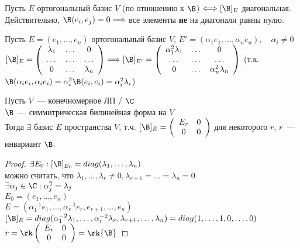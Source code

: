 \notice Пусть $E$ ортогональный базис $V$ (по отношению к $\B$) $\Longleftrightarrow [\B]_E$ диагональная. \\
Действительно, $\B(e_i, e_j) = 0 \Longrightarrow$ все элементы \textbf{не} на диагонали равны нулю.

\notice Пусть $E = (e_1, \dots, e_n)$ ортогональный базис $V$, $E' = (\alpha_1 e_1, \dots, \alpha_n e_n), \quad \alpha_i \neq 0$ \\
$[\B]_E =
\left(\begin{array}{ccc}
\lambda_1 & \dots & 0 \\ 
\dots & \dots & \dots \\ 
0 & \dots & \lambda_n
\end{array}\right)
\Longrightarrow [\B]_{E'} = 
\left(\begin{array}{ccc}
\alpha_1^2 \lambda_1 & \dots & 0 \\ 
\dots & \dots & \dots \\ 
0 & \dots & \alpha_n^2 \lambda_n
\end{array}\right)$ (т.к. $\B(\alpha_i e_i, \alpha_i e_i) = \alpha_i^2 \B(e_i, e_i) = \alpha_i^2 \lambda_i$) 

\begin{theorem}
    Пусть $V$~--- конечномерное ЛП / $\C$ \\
    $\B$~--- симмитрическая билинейная форма на $V$ \\
    Тогда $\exists$ базис $E$ пространства $V$, т.ч.
    $[\B]_E = \left(\begin{array}{cc}
    E_r & 0 \\ 
    0 & 0
    \end{array}\right)$ для некоторого $r$, $r$~--- инвариант $\B$.
    \begin{proof}
        $\exists E_0 : [\B]_{E_0} = diag(\lambda_1, \dots, \lambda_n)$ \\
        можно считать, что $\lambda_1, \dots, \lambda_r \neq 0, \lambda_{r + 1} = \dots = \lambda_n = 0$ \\
        $\exists \alpha_j \in \C: \alpha^2_j = \lambda_j$ \\ 
        $E_0 = (e_1, \dots, e_n)$ \\
        $E = (\alpha^{-1}_1 e_1, \dots, \alpha^{-1}_r e_r, e_{r + 1}, \dots, e_n)$ \\
        $[\B]_E = diag(\alpha^{-2}_1 \lambda_1, \dots, \alpha^{-2}_r \lambda_r, \lambda_{r + 1}, \dots, \lambda_n) = diag(1, \dots, 1, 0, \dots, 0)$ \\
        $r = \rk \left(\begin{array}{cc}
        E_r & 0 \\ 
        0 & 0
        \end{array}\right) = \rk{\B}$
    \end{proof}
\end{theorem}

